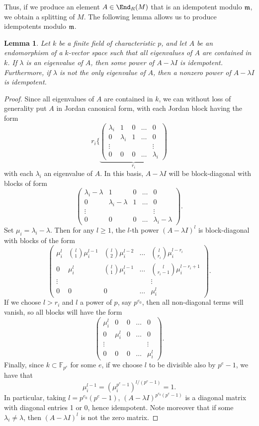 \documentclass[12pt]{article}
\let\l\lambda
\def\FF{\mathbb F}
\theoremstyle{theorem}
\numberwithin{thm}{section}
\newtheorem{lem}[thm]{Lemma}
\theoremstyle{definition}
\begin{document}
Thus, if we produce an element $A\in \End_R(M)$ that is an idempotent modulo $\mathfrak m$, we obtain a splitting of $M$.
The following lemma allows us to produce idempotents modulo $\mathfrak m$.

\begin{lem}\label{lem:jordan}
  Let $k$ be a finite field of characteristic $p$, and let $A$ be an endomorphism of a $k$-vector space such that all eigenvalues of $A$ are contained in $k$. If $\l$ is an eigenvalue of $A$, then some power of $A-\l I$ is idempotent.
  Furthermore, if $\l$ is not the only eigenvalue of $A$, then a  nonzero power of $A-\l I$ is idempotent.
\end{lem}
\begin{proof}
  Since all eigenvalues of $A$ are contained in $k$, we can without loss of generality put $A$ in Jordan canonical form, with each Jordan block having the form
  \[ r_i\Biggl\{
  \underbrace{\begin{pmatrix}
      \l_i & 1 & 0 & \dots & 0 \\
      0 & \l_i & 1  & \dots & 0 \\
      \vdots & & & & \vdots \\
      0 & 0 & 0 & \dots & \l_i
  \end{pmatrix}}_{r_i} \]
  with each $\l_i$ an eigenvalue of $A$.
  In this basis, $A-\l I$ will be block-diagonal with blocks of form
  \[ \begin{pmatrix}
    \l_i-\l & 1 & 0 & \dots & 0 \\
    0 & \l_i-\l & 1 & \dots & 0 \\
    \vdots & & & & \vdots \\
    0 & 0 & 0 & \dots & \l_i-\l
  \end{pmatrix}. \]
  Set $\mu_i=\l_i-\l$. Then for any $l\geq 1$, the $l$-th power $(A-\l I)^l$ is block-diagonal with blocks of the form
  \[ \begin{pmatrix}
    \mu_i^l & \binom{l}1\mu_i^{l-1} & \binom{l}2\mu_i^{l-2} & \dots & \binom{l}{r_i}\mu_i^{l-r_i} \\
    0 & \mu_i^l & \binom{l}1\mu_i^{l-1} & \dots & \binom{l}{r_i-1}\mu_i^{l-r_i+1} \\
    \vdots & & & & \vdots \\
    0 & 0 & 0 & \dots & \mu_i^l
  \end{pmatrix}. \]
  If we choose $l > r_i$ and $l$ a power of $p$, say $p^{e_0}$, then all non-diagonal terms will vanish, so all blocks will have the form
  \[ \begin{pmatrix}
    \mu_i^l & 0 & 0 & \dots & 0 \\
    0 & \mu_i^l & 0 & \dots & 0 \\
    \vdots & & & & \vdots \\
    0 & 0 & 0 & \dots & \mu_i^l
  \end{pmatrix}. \]
  Finally, since $k\subset \FF_{p^e}$ for some $e$, if we choose $l$ to be divisible also by $p^e-1$, we have that $$\mu_i^{l-1} = (\mu_i^{p^{e}-1})^{l/(p^{e}-1)} =1.$$
  In particular, taking $l=p^{e_0}(p^e-1)$,
  $(A-\l I)^{p^{e_0}(p^e-1)}$ is a diagonal matrix with diagonal entries 1 or 0, hence idempotent. Note moreover that if some $\l_i\neq \l$, then $(A-\l I)^l$ is not the zero matrix.
\end{proof}
\end{document}
